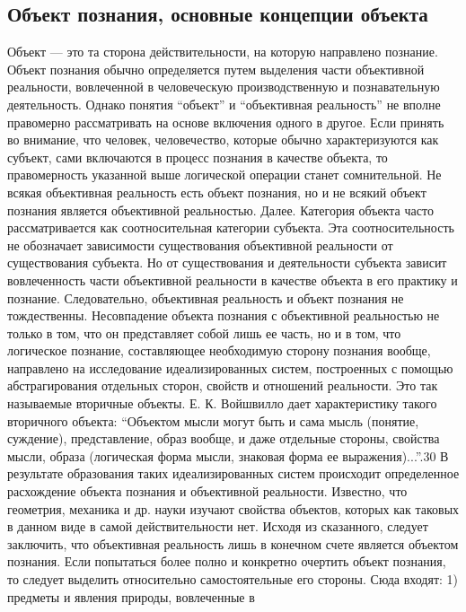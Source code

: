 \documentclass[12pt]{article}
\begin{document}
\subsection{Объект познания, основные концепции объекта}
Объект — это та сторона действительности, на которую направлено познание.
Объект  познания  обычно  определяется  путем  выделения  части  объективной  реальности,  вовлеченной  в
человеческую производственную и познавательную деятельность. Однако понятия “объект” и “объективная
реальность” не вполне правомерно рассматривать на основе включения одного в другое. Если принять во
внимание,  что  человек,  человечество,  которые  обычно  характеризуются  как  субъект,  сами  включаются  в
процесс  познания  в  качестве  объекта,  то  правомерность  указанной  выше  логической  операции  станет
сомнительной.  Не  всякая  объективная  реальность  есть  объект  познания,  но  и  не  всякий  объект  познания
является объективной реальностью.
Далее.  Категория  объекта  часто  рассматривается  как  соотносительная  категории  субъекта.  Эта
соотносительность  не  обозначает  зависимости  существования  объективной  реальности  от  существования
субъекта. Но от существования и деятельности субъекта зависит вовлеченность части объективной реальности в
качестве объекта в его практику и познание. Следовательно, объективная реальность и объект познания не
тождественны.
Несовпадение объекта познания с объективной реальностью не только в том, что он представляет собой лишь
ее  часть,  но  и  в  том,  что  логическое  познание,  составляющее  необходимую  сторону  познания  вообще,
направлено на исследование идеализированных систем, построенных с помощью абстрагирования отдельных
сторон, свойств и отношений реальности. Это так называемые вторичные объекты. Е. К. Войшвилло дает
характеристику такого вторичного объекта: “Объектом мысли могут быть и сама мысль (понятие, суждение),
представление, образ вообще, и даже отдельные стороны, свойства мысли, образа (логическая форма мысли,
знаковая форма ее выражения)...”.30 В результате образования таких идеализированных систем происходит
определенное расхождение объекта познания и объективной реальности. Известно, что геометрия, механика и
др. науки изучают свойства объектов, которых как таковых в данном виде в самой действительности нет.
Исходя  из  сказанного,  следует  заключить,  что  объективная  реальность  лишь  в  конечном  счете  является
объектом познания. Если попытаться более полно и конкретно очертить объект познания, то следует выделить
относительно самостоятельные его стороны. Сюда входят: 1) предметы и явления природы, вовлеченные в
\end{document}
